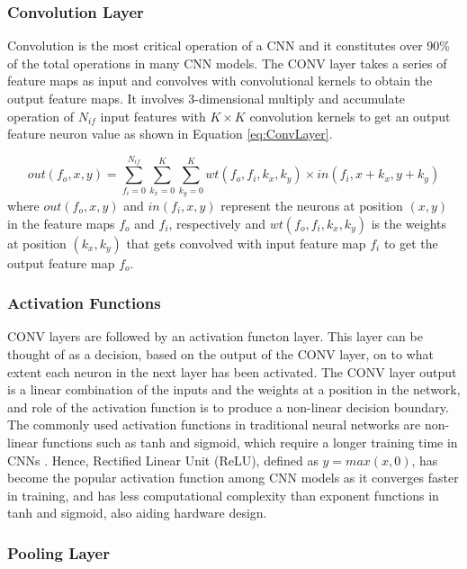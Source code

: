 \documentclass[11pt]{article}
\begin{document}
\subsubsection{Convolution Layer}
\label{sec:Background-CNN-Conv}

Convolution is the most critical operation of a CNN and it constitutes over 90\% of the total operations in many CNN models. The CONV layer takes a series of feature maps as input and convolves with convolutional kernels to obtain the output feature maps. It involves 3-dimensional multiply and accumulate operation of $N_{if}$ input features with $K\times K$ convolution kernels to get an output feature neuron value as shown in Equation \ref{eq:ConvLayer}.

\begin{equation}
out(f_o,x,y)=\sum^{N_{if}}_{f_i=0} \sum^{K}_{k_x=0} \sum^{K}_{k_y=0} wt(f_o,f_i,k_x,k_y)\times in(f_i,x+k_x,y+k_y)
\label{eq:ConvLayer}
\end{equation}
where $out(f_o,x,y)$ and $in(f_i,x,y)$ represent the neurons at position $(x,y)$ in the feature maps $f_o$ and $f_i$, respectively and $wt(f_o,f_i,k_x,k_y)$ is the weights at position $(k_x,k_y)$ that gets convolved with input feature map $f_i$ to get the output feature map $f_o$.

\subsubsection{Activation Functions}
\label{sec:Background-CNN-Activation}

CONV layers are followed by an activation functon layer. This layer can be thought of as a decision, based on the output of the CONV layer, on to what extent each neuron in the next layer has been activated. The CONV layer output is a linear combination of the inputs and the weights at a position in the network, and role of the activation function is to produce a non-linear decision boundary. The commonly used activation functions in traditional neural networks are non-linear functions such as tanh and sigmoid, which require a longer training time in CNNs \cite{AlexNet}. Hence, Rectified Linear Unit (ReLU), defined as $y = max(x,0)$, has become the popular activation function among CNN models as it converges faster in training, and has less computational complexity than exponent functions in tanh and sigmoid, also aiding hardware design.

\subsubsection{Pooling Layer}
\label{sec:Background-CNN-Pool}
\end{document}
